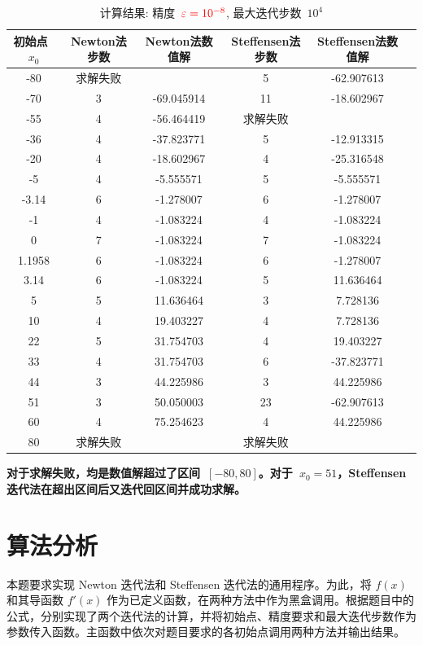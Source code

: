 \documentclass[UTF8]{ctexart}
\begin{document}
\begin{table}[htb]
\centering
\caption{计算结果: 精度~$\color{red}\varepsilon = 10^{-8}$, 最大迭代步数~$10^4$}
\begin{tabular}{cccccc}
\hline
初始点~$x_0$ & Newton法步数 & Newton法数值解 & Steffensen法步数 & Steffensen法数值解 \\
\hline
-80 & 求解失败 &  & 5 & -62.907613 \\
-70 & 3 & -69.045914 & 11 & -18.602967 \\
-55 & 4 & -56.464419 & 求解失败 &  \\
-36 & 4 & -37.823771 & 5 & -12.913315 \\
-20 & 4 & -18.602967 & 4 & -25.316548 \\
-5 & 4 & -5.555571 & 5 & -5.555571 \\
-3.14 & 6 & -1.278007 & 6 & -1.278007 \\
-1 & 4 & -1.083224 & 4 & -1.083224 \\
0 & 7 & -1.083224 & 7 & -1.083224 \\
1.1958 & 6 & -1.083224 & 6 & -1.278007 \\
3.14 & 6 & -1.083224 & 5 & 11.636464 \\
5 & 5 & 11.636464 & 3 & 7.728136 \\
10 & 4 & 19.403227 & 4 & 7.728136 \\
22 & 5 & 31.754703 & 4 & 19.403227 \\
33 & 4 & 31.754703 & 6 & -37.823771 \\
44 & 3 & 44.225986 & 3 & 44.225986 \\
51 & 3 & 50.050003 & 23 & -62.907613 \\
60 & 4 & 75.254623 & 4 & 44.225986 \\
80 & 求解失败 &  & 求解失败 &  \\
\hline
\end{tabular}
\end{table}

{\bf 对于求解失败，均是数值解超过了区间~$[-80,80]$。对于~$x_0=51$，Steffensen迭代法在超出区间后又迭代回区间并成功求解。}

\section{算法分析}
本题要求实现 Newton 迭代法和 Steffensen 迭代法的通用程序。为此，将 $f(x)$ 和其导函数 $f'(x)$ 作为已定义函数，在两种方法中作为黑盒调用。根据题目中的公式，分别实现了两个迭代法的计算，并将初始点、精度要求和最大迭代步数作为参数传入函数。主函数中依次对题目要求的各初始点调用两种方法并输出结果。
\end{document}
